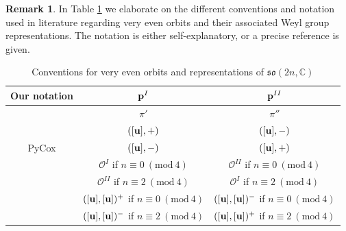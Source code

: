 \documentclass[reqno,12pt]{amsart}
\numberwithin{equation}{section}
\theoremstyle{plain}
\theoremstyle{definition}
\newtheorem{Rem}[Thm]{Remark}
\begin{document}
\begin{Rem}
    In Table \ref{primes} we elaborate on the different conventions and notation used in literature regarding very even orbits and their associated Weyl group representations. The notation is either self-explanatory, or a precise reference is given. 


\begin{table}[htbp]\caption{Conventions for very even orbits and representations of $\mathfrak{so}(2n,\mathbb{C})$}
	\label{primes}
	\centering
	\renewcommand{\arraystretch}{1.5}
	\setlength\tabcolsep{5pt}
	
	\begin{tabular}{|c|c|c|}
		\hline {Our notation}  &${\bf p}^I$ & ${\bf p}^{II}$ \\ \hline
       
        \cite[p. 89]{lusztig1984char} & $\pi'$ & $\pi''$ \\
        \hline

        \cite[p. 170]{GP} & $([\bf u],+)$ & $([\bf u],-)$ \\
        \hline

 PyCox & $([\bf u],-)$ & $([\bf u],+)$ \\
        \hline
 \cite[p. 83]{CM} & $\mathcal{O}^I$ if $n\equiv 0 ~(\mathrm{mod}~ 4)$ & $\mathcal{O}^{II}$ if $n\equiv 0 ~(\mathrm{mod}~ 4)$\\
 & $\mathcal{O}^{II}$ if $n\equiv 2 ~(\mathrm{mod}~ 4)$ & $\mathcal{O}^{I}$ if $n\equiv 2 ~(\mathrm{mod}~ 4)$\\
\hline

\cite{Alv} & $([\bf u],[\bf u])^+$ if $n\equiv 0 ~(\mathrm{mod}~ 4)$ & $([\bf u],[\bf u])^-$ if $n\equiv 0 ~(\mathrm{mod}~ 4)$\\
 & $([\bf u],[\bf u])^-$ if $n\equiv 2 ~(\mathrm{mod}~ 4)$ & $([\bf u],[\bf u])^+$ if $n\equiv 2 ~(\mathrm{mod}~ 4)$\\
\hline

 
 \end{tabular}
	\bigskip
	
\end{table}


















\end{Rem}
\end{document}
